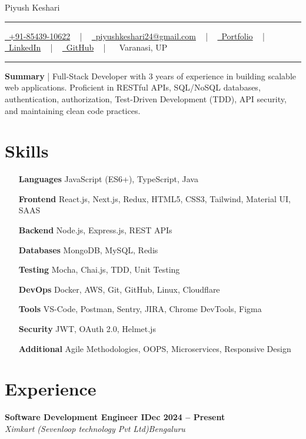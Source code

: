 \documentclass[letterpaper, 10pt]{article}
\newcommand{\documentTitle}[2]{
\begin{center}
    {\Huge\color{accentTitle} #1}
    \vspace{1pt}
    {\color{accentLine} \hrule height 0.8pt}
    \vspace{1pt}
    \footnotesize{#2}
    \vspace{1pt}
    {\color{accentLine} \hrule height 0.8pt}
\end{center}
}
\newcommand{\tinysection}[1]{ \phantomsection
\addcontentsline{toc}{section}{#1}
{\large{\bfseries\color{accentText}#1} {\color{accentLine} |}}
\vspace{1pt}
}
\newcommand{\heading}[2]{ \hspace{5pt}#1\hfill#2\\[1pt] }
\newcommand{\headingBf}[2]{ \heading{\textbf{#1}}{\textbf{#2}} }
\newcommand{\headingIt}[2]{ \heading{\textit{#1}}{\textit{#2}} }
\begin{document}
\documentTitle{Piyush Keshari}{ \href{tel:+918543910622}{ \raisebox{-0.05\height}{\faPhone}\ +91-85439-10622} ~ | ~ \href{mailto:piyushkeshari24@gmail.com}{ \raisebox{-0.15\height}{\faEnvelope}\ piyushkeshari24@gmail.com} ~ | ~ \href{https://kesharipiyush24.github.io/}{ \raisebox{-0.15\height}{\faGlobe}\ Portfolio} ~ | ~ \href{https://linkedin.com/in/piyush-k-ba3a67134}{ \raisebox{-0.15\height}{\faLinkedin}\ LinkedIn} ~ | ~ \href{https://github.com/KeshariPiyush24}{ \raisebox{-0.15\height}{\faGithub}\ GitHub} ~ | ~  \raisebox{-0.15\height}{\faMapMarker}\ Varanasi, UP}

\tinysection{Summary} Full-Stack Developer with 3 years of experience in building scalable web applications. Proficient in RESTful APIs, SQL/NoSQL databases, authentication, authorization, Test-Driven Development (TDD), API security, and maintaining clean code practices.

\section{Skills}
\begin{multicols}{2}
    \begin{itemize}[itemsep=0.5pt, parsep=0.5pt, leftmargin=65pt]
        \item[\textbf{Languages}] JavaScript (ES6+), TypeScript, Java
        \item[\textbf{Frontend}] React.js, Next.js, Redux, HTML5, CSS3, Tailwind, Material UI, SAAS
        \item[\textbf{Backend}] Node.js, Express.js, REST APIs
        \item[\textbf{Databases}] MongoDB, MySQL, Redis
        \item[\textbf{Testing}] Mocha, Chai.js, TDD, Unit Testing
        \item[\textbf{DevOps}] Docker, AWS, Git, GitHub,
        Linux, Cloudflare
        \item[\textbf{Tools}] VS-Code, Postman, Sentry, JIRA, Chrome DevTools, Figma
        \item[\textbf{Security}] JWT, OAuth 2.0, Helmet.js
        \item[\textbf{Additional}] Agile Methodologies, OOPS, Microservices, Responsive Design
    \end{itemize}
\end{multicols}

\section{Experience}
\headingBf{Software Development Engineer I}{Dec 2024 -- Present}
\headingIt{Ximkart (Sevenloop technology Pvt Ltd)}{Bengaluru}
\end{document}
